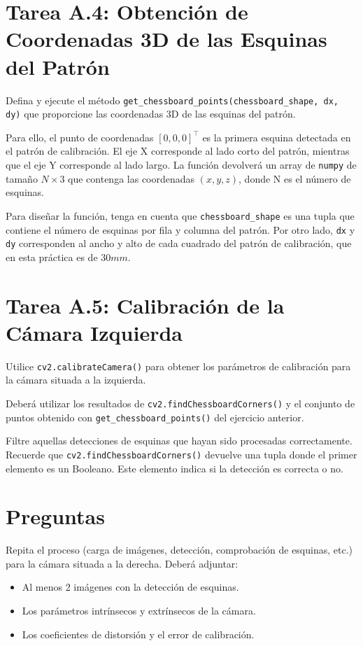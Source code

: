 \section*{Tarea A.4: Obtención de Coordenadas 3D de las Esquinas del Patrón}
Defina y ejecute el método \texttt{get\_chessboard\_points(chessboard\_shape, dx, dy)} que proporcione las coordenadas 3D de las esquinas del patrón.

Para ello, el punto de coordenadas $[0, 0, 0]^\top$ es la primera esquina detectada en el patrón de calibración. El eje X corresponde al lado corto del patrón, mientras que el eje Y corresponde al lado largo. La función devolverá un array de \texttt{numpy} de tamaño $ N \times 3 $ que contenga las coordenadas $(x, y, z)$, donde N es el número de esquinas.

Para diseñar la función, tenga en cuenta que \texttt{chessboard\_shape} es una tupla que contiene el número de esquinas por fila y columna del patrón. Por otro lado, \texttt{dx} y \texttt{dy} corresponden al ancho y alto de cada cuadrado del patrón de calibración, que en esta práctica es de $30mm$.


\section*{Tarea A.5: Calibración de la Cámara Izquierda}
Utilice \texttt{cv2.calibrateCamera()} para obtener los parámetros de calibración para la cámara situada a la izquierda.

Deberá utilizar los resultados de \texttt{cv2.findChessboardCorners()} y el conjunto de puntos obtenido con \texttt{get\_chessboard\_points()} del ejercicio anterior.

Filtre aquellas detecciones de esquinas que hayan sido procesadas correctamente. Recuerde que \texttt{cv2.findChessboardCorners()} devuelve una tupla donde el primer elemento es un Booleano. Este elemento indica si la detección es correcta o no.


\newpage
\section*{Preguntas}

\vspace{5mm}
\begin{tcolorbox}[colback=gray!10, colframe=gray!30, coltitle=black, title=Pregunta A.1, halign=left]
Repita el proceso (carga de imágenes, detección, comprobación de esquinas, etc.) para la cámara situada a la derecha. Deberá adjuntar:
\begin{itemize}
    \item Al menos 2 imágenes con la detección de esquinas.
    \item Los parámetros intrínsecos y extrínsecos de la cámara.
    \item Los coeficientes de distorsión y el error de calibración.
\end{itemize}
\end{tcolorbox}


